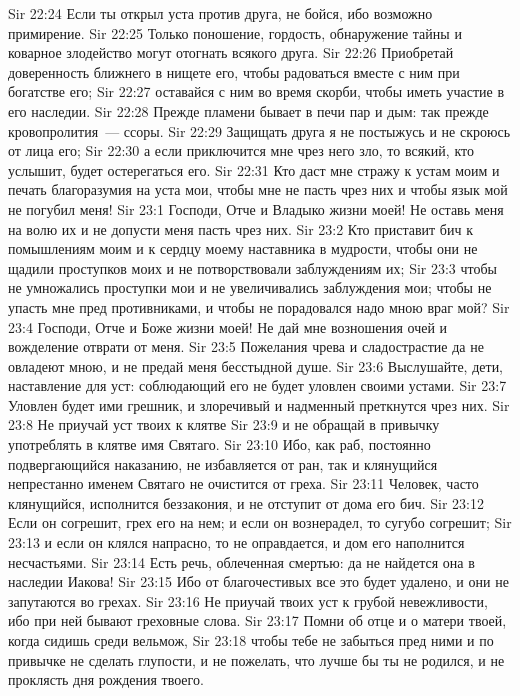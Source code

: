 \vs Sir 22:24 Если ты открыл уста против друга, не бойся, ибо возможно примирение.
\vs Sir 22:25 Только поношение, гордость, обнаружение тайны и коварное злодейство могут отогнать всякого друга.
\vs Sir 22:26 Приобретай доверенность ближнего в нищете его, чтобы радоваться вместе с ним при богатстве его;
\vs Sir 22:27 оставайся с ним во время скорби, чтобы иметь участие в его наследии.
\vs Sir 22:28 Прежде пламени бывает в печи пар и дым: так прежде кровопролития~--- ссоры.
\vs Sir 22:29 Защищать друга я не постыжусь и не скроюсь от лица его;
\vs Sir 22:30 а если приключится мне чрез него зло, то всякий, кто услышит, будет остерегаться его.
\rsbpar\vs Sir 22:31 Кто даст мне стражу к устам моим и печать благоразумия на уста мои, чтобы мне не пасть чрез них и чтобы язык мой не погубил меня!
\vs Sir 23:1 Господи, Отче и Владыко жизни моей! Не оставь меня на волю их и не допусти меня пасть чрез них.
\vs Sir 23:2 Кто приставит бич к помышлениям моим и к сердцу моему наставника в мудрости, чтобы они не щадили проступков моих и не потворствовали заблуждениям их;
\vs Sir 23:3 чтобы не умножались проступки мои и не увеличивались заблуждения мои; чтобы не упасть мне пред противниками, и чтобы не порадовался надо мною враг мой?
\vs Sir 23:4 Господи, Отче и Боже жизни моей! Не дай мне возношения очей и вожделение отврати от меня.
\vs Sir 23:5 Пожелания чрева и сладострастие да не овладеют мною, и не предай меня бесстыдной душе.
\rsbpar\vs Sir 23:6 Выслушайте, дети, наставление для уст: соблюдающий его не будет уловлен своими устами.
\vs Sir 23:7 Уловлен будет ими грешник, и злоречивый и надменный преткнутся чрез них.
\vs Sir 23:8 Не приучай уст твоих к клятве
\vs Sir 23:9 и не обращай в привычку употреблять в клятве имя Святаго.
\vs Sir 23:10 Ибо, как раб, постоянно подвергающийся наказанию, не избавляется от ран, так и клянущийся непрестанно именем Святаго не очистится от греха.
\vs Sir 23:11 Человек, часто клянущийся, исполнится беззакония, и не отступит от дома его бич.
\vs Sir 23:12 Если он согрешит, грех его на нем; и если он вознерадел, то сугубо согрешит;
\vs Sir 23:13 и если он клялся напрасно, то не оправдается, и дом его наполнится несчастьями.
\vs Sir 23:14 Есть речь, облеченная смертью: да не найдется она в наследии Иакова!
\vs Sir 23:15 Ибо от благочестивых все это будет удалено, и они не запутаются во грехах.
\vs Sir 23:16 Не приучай твоих уст к грубой невежливости, ибо при ней бывают греховные слова.
\vs Sir 23:17 Помни об отце и о матери твоей, когда сидишь среди вельмож,
\vs Sir 23:18 чтобы тебе не забыться пред ними и по привычке не сделать глупости, и не пожелать, что лучше бы ты не родился, и не проклясть дня рождения твоего.
